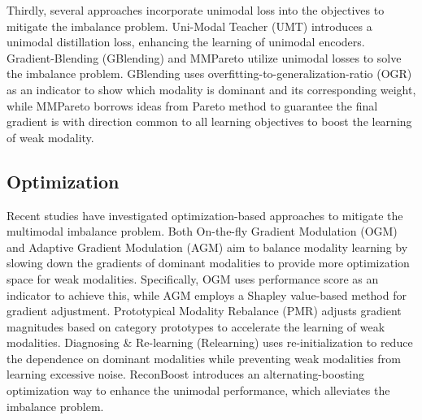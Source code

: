 Thirdly, several approaches incorporate unimodal loss into the objectives to mitigate the imbalance problem. Uni-Modal Teacher (UMT) \cite{UMT_Du} introduces a unimodal distillation loss, enhancing the learning of unimodal encoders. Gradient-Blending (GBlending) \cite{Gblending_Wang} and MMPareto \cite{MMPareto_Wei} utilize unimodal losses to solve the imbalance problem. GBlending \cite{Gblending_Wang} uses overfitting-to-generalization-ratio (OGR) as an indicator to show which modality is dominant and its corresponding weight, while MMPareto \cite{MMPareto_Wei} borrows ideas from Pareto method \cite{ParetoInMultitask} to guarantee the final gradient is with direction common to all learning objectives to boost the learning of weak modality. 

\subsection{Optimization}
Recent studies have investigated optimization-based approaches to mitigate the multimodal imbalance problem. Both On-the-fly Gradient Modulation (OGM) \cite{OGM_CVPR} and Adaptive Gradient Modulation (AGM) \cite{AGM_Li} aim to balance modality learning by slowing down the gradients of dominant modalities to provide more optimization space for weak modalities. Specifically, OGM \cite{OGM_CVPR} uses performance score as an indicator to achieve this, while AGM \cite{AGM_Li} employs a Shapley value-based method for gradient adjustment. Prototypical Modality Rebalance (PMR) \cite{PMR_Fan} adjusts gradient magnitudes based on category prototypes to accelerate the learning of weak modalities. Diagnosing \& Re-learning (Relearning) \cite{Relearning_wei} uses re-initialization to reduce the dependence on dominant modalities while preventing weak modalities from learning excessive noise. ReconBoost \cite{ReconBoost_Huang} introduces an alternating-boosting optimization way to enhance the unimodal performance, which alleviates the imbalance problem.